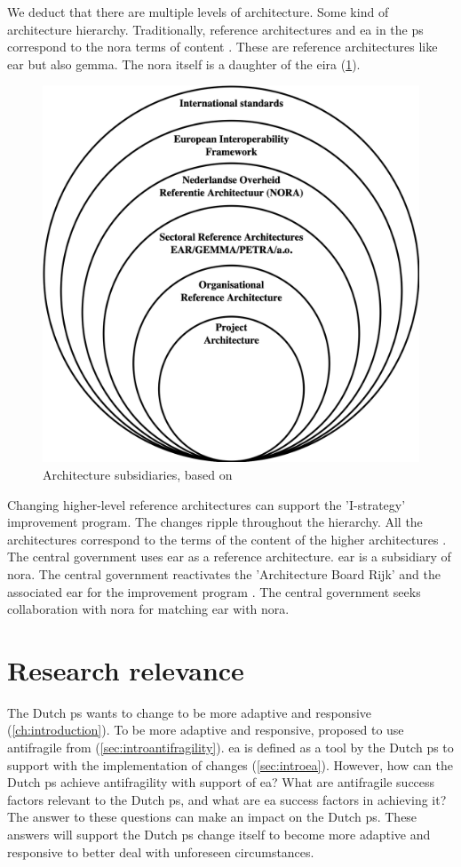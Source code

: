 We deduct that there are multiple levels of architecture. Some kind of architecture hierarchy. Traditionally, reference architectures and \gls{ea} in the \gls{ps} correspond to the \acrshort{nora} terms of content \parencite{NORAfamilie}. These are reference architectures like \acrshort{ear} but also \acrfull{gemma}. The \acrshort{nora} itself is a daughter of the \acrfull{eira} (\cref{fig:architectureviewonion}).
\begin{figure}[H]
	\centering
	\includegraphics[width=0.5\linewidth]{images/architectureviewonion}
	\caption[Architecture subsidiaries, based on \textcite{Greefhorst2008}]{Architecture subsidiaries, based on \textcite{Greefhorst2008}}
	\label{fig:architectureviewonion}
\end{figure}
Changing higher-level reference architectures can support the 'I-strategy' improvement program. The changes ripple throughout the hierarchy. All the architectures correspond to the terms of the content of the higher architectures \parencite{NORAfamilie}. The central government uses \acrshort{ear} as a reference architecture. \acrshort{ear} is a subsidiary of \acrshort{nora}. The central government reactivates the 'Architecture Board Rijk' and the associated \acrshort{ear} for the improvement program \parencite[p.~42]{Digitaleoverheid2021}. The central government seeks collaboration with \acrshort{nora} for matching \acrshort{ear} with \acrshort{nora}.

\section{Research relevance}
\label{sec:researchrelevance}
The Dutch \gls{ps} wants to change to be more adaptive and responsive (\cref{ch:introduction}). To be more adaptive and responsive, \textcite{Steen2018} proposed to use \gls{antifragile} from \textcite{Taleb2012} (\cref{sec:introantifragility}). \gls{ea} is defined as a tool by the Dutch \gls{ps} to support with the implementation of changes (\cref{sec:introea}). However, how can the Dutch \gls{ps} achieve \gls{antifragility} with support of \gls{ea}? What are \gls{antifragile} success factors relevant to the Dutch \gls{ps}, and what are \gls{ea} success factors in achieving it? The answer to these questions can make an impact on the Dutch \gls{ps}. These answers will support the Dutch \gls{ps} change itself to become more adaptive and responsive to better deal with unforeseen circumstances.

